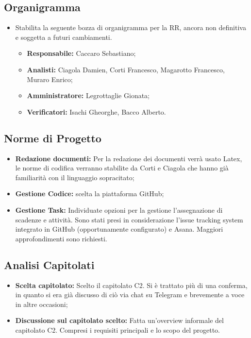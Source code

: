 \documentclass[a4paper, oneside, openany, dvipsnames, table]{article}
\begin{document}
\subsection{Organigramma}
\begin{itemize}
\item Stabilita la seguente bozza di organigramma per la RR, ancora non definitiva e soggetta a futuri cambiamenti.
	\begin{itemize}
	\item \textbf{Responsabile:} Caccaro Sebastiano;
	\item \textbf{Analisti:} Ciagola Damien, Corti Francesco, Magarotto Francesco, Muraro Enrico;
	\item \textbf{Amministratore:} Legrottaglie Gionata;
	\item \textbf{Verificatori:} Isachi Gheorghe, Bacco Alberto.
	\end{itemize}
\end{itemize}

\subsection{Norme di Progetto}
\begin{itemize}
\item \textbf{Redazione documenti:} Per la redazione dei documenti verrà usato Latex, le norme di codifica verranno stabilite da Corti e Ciagola che hanno già familiarità con il linguaggio sopracitato;
\item \textbf{Gestione Codice:} scelta la piattaforma GitHub;
\item \textbf{Gestione Task:} Individuate opzioni per la gestione l'assegnazione di scadenze e attività. Sono stati presi in considerazione l’issue tracking system integrato in GitHub (opportunamente configurato) e Asana. Maggiori approfondimenti sono richiesti.
\end{itemize}

\subsection{Analisi Capitolati}
\begin{itemize}
\item \textbf{Scelta capitolato:} Scelto il capitolato C2. Si è trattato più di una conferma, in quanto si era già discusso di ciò via chat su Telegram e brevemente a voce in altre occasioni;
\item \textbf{Discussione sul capitolato scelto:} Fatta un’overview informale del capitolato C2. Compresi i requisiti principali e lo scopo del progetto.
\end{itemize}
\end{document}
